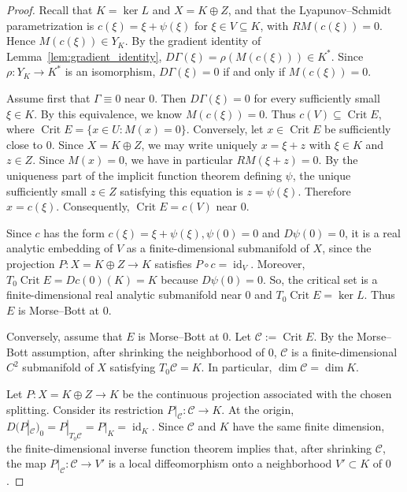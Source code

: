 \documentclass[11pt]{article}
\theoremstyle{definition}
\theoremstyle{remark}
\begin{document}
\begin{proof}
Recall that $K = \ker L$ and $X = K \oplus Z$, and that the Lyapunov--Schmidt parametrization is
$c(\xi) = \xi + \psi(\xi)$ for  $\xi \in V \subseteq K$, with $R M(c(\xi)) = 0$. 
Hence $M(c(\xi)) \in Y_K$. By the gradient identity of Lemma~\ref{lem:gradient_identity},
$D\Gamma(\xi) = \rho(M(c(\xi))) \in K^*$. 
Since $\rho:Y_K\to K^*$ is an isomorphism, $D\Gamma(\xi)=0$ if and only if $M(c(\xi))=0$.

\medskip
Assume first that $\Gamma \equiv 0$ near $0$. Then $D\Gamma(\xi) = 0$ for every sufficiently small $\xi \in K$. By this equivalence,
we know $M(c(\xi)) = 0$. Thus $c(V) \subseteq \operatorname{Crit}E$, where $\operatorname{Crit}E = \{x \in U : M(x) = 0\}$.
Conversely, let $x \in \operatorname{Crit}E$ be sufficiently close to $0$. Since $X=K\oplus Z$, we may write uniquely $x=\xi+z$ with $\xi\in K$ and $z\in Z$.
Since $M(x) = 0$, we have in particular $R M(\xi + z) = 0$. 
By the uniqueness part of the implicit function theorem defining $\psi$, the unique sufficiently small $z \in Z$ satisfying this equation is
$z = \psi(\xi)$. Therefore $x = c(\xi)$. Consequently, $\operatorname{Crit}E = c(V)$ near $0$.

\smallskip
Since $c$ has the form $c(\xi) = \xi + \psi(\xi),  \psi(0) = 0$ and $D\psi(0) = 0$, 
it is a real analytic embedding of $V$ as a finite-dimensional submanifold of $X$, since the projection $P:X=K\oplus Z\to K$ satisfies $P\circ c=\operatorname{id}_V$. Moreover, $T_0\operatorname{Crit}E=Dc(0)(K)=K$ because $D\psi(0)=0$.
So, the critical set is a finite-dimensional real analytic submanifold near $0$ and
$T_0 \operatorname{Crit}E = \ker L$. Thus $E$ is Morse--Bott at $0$.

\medskip
Conversely, assume that $E$ is Morse--Bott at $0$. Let $\mathcal{C} := \operatorname{Crit}E$. 
By the Morse--Bott assumption, after shrinking the neighborhood of $0$, $\mathcal{C}$ is a finite-dimensional $C^2$ submanifold of $X$ satisfying
$T_0 \mathcal{C} = K$. In particular, $\dim \mathcal{C} = \dim K$.

\medskip
Let $P : X = K \oplus Z \longrightarrow K$
be the continuous projection associated with the chosen splitting. Consider its restriction
$P|_{\mathcal{C}} : \mathcal{C} \longrightarrow K$. At the origin, $D(P|_{\mathcal C})_0=P|_{T_0\mathcal C}=P|_K=\operatorname{id}_K$.
Since $\mathcal{C}$ and $K$ have the same finite dimension, the finite-dimensional inverse function theorem implies that, after shrinking $\mathcal{C}$, the map
$P|_{\mathcal{C}} : \mathcal{C} \longrightarrow V'$
is a local diffeomorphism onto a neighborhood $V' \subset K$ of $0$.


\end{proof}
\end{document}
